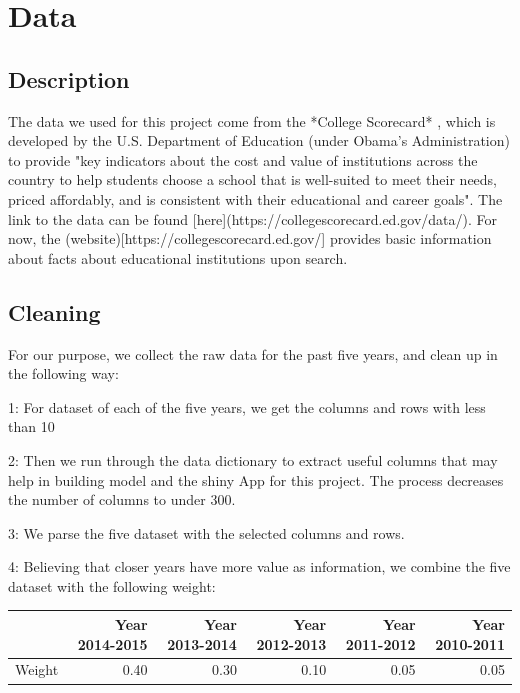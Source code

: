 \documentclass{article}\usepackage[]{graphicx}\usepackage[]{color}
\begin{document}
\maketitle
\section{Data}



\subsection{Description}

The data we used for this project come from the *College Scorecard* , which is developed by the U.S. Department of Education (under Obama's Administration) to provide "key indicators about the cost and value of institutions across the country to help students choose a school that is well-suited to meet their needs, priced affordably, and is consistent with their educational and career goals". The link to the data can be found [here](https://collegescorecard.ed.gov/data/). For now, the (website)[https://collegescorecard.ed.gov/] provides basic information about facts about educational institutions upon search. 

\subsection{Cleaning}
For our purpose, we collect the raw data for the past five years, and clean up in the following way:

1: For dataset of each of the five years, we get the columns and rows with less than 10%

2: Then we run through the data dictionary to extract useful columns that may help in building model and the shiny App for this project. The process decreases the number of columns to under 300.

3: We parse the five dataset with the selected columns and rows.

4: Believing that closer years have more value as information, we combine the five dataset with the following weight:

\begin{table}[ht]
\centering
\begin{tabular}{rrrrrr}
  \hline
 & Year 2014-2015 & Year 2013-2014 & Year 2012-2013 & Year 2011-2012 & Year 2010-2011 \\ 
  \hline
Weight & 0.40 & 0.30 & 0.10 & 0.05 & 0.05 \\ 
   \hline
\end{tabular}
\end{table}
\end{document}
